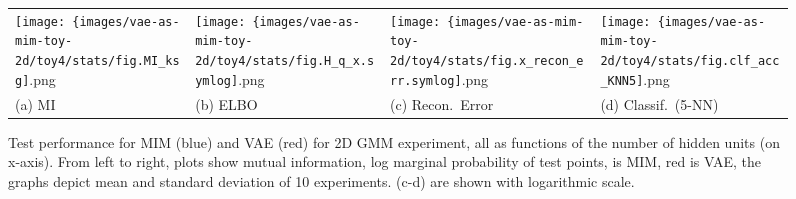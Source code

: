 \begin{figure}[ht]
    \centering
    \setlength{\tabcolsep}{0pt}
    \begin{tabular}{*4{>{\centering\arraybackslash}m{}}}
      \texttt{[image: \{images/vae-as-mim-toy-2d/toy4/stats/fig.MI\_ksg]}.png}
    & \texttt{[image: \{images/vae-as-mim-toy-2d/toy4/stats/fig.H\_q\_x.symlog]}.png}
    & \texttt{[image: \{images/vae-as-mim-toy-2d/toy4/stats/fig.x\_recon\_err.symlog]}.png}
        & \texttt{[image: \{images/vae-as-mim-toy-2d/toy4/stats/fig.clf\_acc\_KNN5]}.png}
    \\
    (a) MI & (b)  ELBO & (c) Recon.\ Error & (d) Classif.\ (5-NN)
    \end{tabular}
    \caption{Test performance for MIM (blue) and VAE (red) for 2D GMM experiment,
    all as functions of the number of hidden units (on x-axis). From left to right,
    plots show mutual information, log marginal probability of test points,  is MIM, red is VAE, the graphs depict mean and standard deviation of 10 experiments. (c-d) are shown with logarithmic scale.
    }\label{fig:posterior-collapse-quantitative}
\end{figure}





